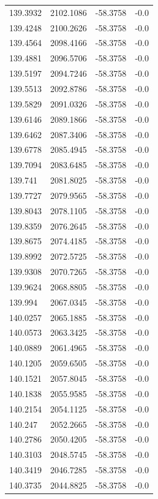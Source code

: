 \begin{table}[H]
\begin{tabular}{llll}
139.3932 & 2102.1086 & -58.3758 & -0.0 \\
139.4248 & 2100.2626 & -58.3758 & -0.0 \\
139.4564 & 2098.4166 & -58.3758 & -0.0 \\
139.4881 & 2096.5706 & -58.3758 & -0.0 \\
139.5197 & 2094.7246 & -58.3758 & -0.0 \\
139.5513 & 2092.8786 & -58.3758 & -0.0 \\
139.5829 & 2091.0326 & -58.3758 & -0.0 \\
139.6146 & 2089.1866 & -58.3758 & -0.0 \\
139.6462 & 2087.3406 & -58.3758 & -0.0 \\
139.6778 & 2085.4945 & -58.3758 & -0.0 \\
139.7094 & 2083.6485 & -58.3758 & -0.0 \\
139.741 & 2081.8025 & -58.3758 & -0.0 \\
139.7727 & 2079.9565 & -58.3758 & -0.0 \\
139.8043 & 2078.1105 & -58.3758 & -0.0 \\
139.8359 & 2076.2645 & -58.3758 & -0.0 \\
139.8675 & 2074.4185 & -58.3758 & -0.0 \\
139.8992 & 2072.5725 & -58.3758 & -0.0 \\
139.9308 & 2070.7265 & -58.3758 & -0.0 \\
139.9624 & 2068.8805 & -58.3758 & -0.0 \\
139.994 & 2067.0345 & -58.3758 & -0.0 \\
140.0257 & 2065.1885 & -58.3758 & -0.0 \\
140.0573 & 2063.3425 & -58.3758 & -0.0 \\
140.0889 & 2061.4965 & -58.3758 & -0.0 \\
140.1205 & 2059.6505 & -58.3758 & -0.0 \\
140.1521 & 2057.8045 & -58.3758 & -0.0 \\
140.1838 & 2055.9585 & -58.3758 & -0.0 \\
140.2154 & 2054.1125 & -58.3758 & -0.0 \\
140.247 & 2052.2665 & -58.3758 & -0.0 \\
140.2786 & 2050.4205 & -58.3758 & -0.0 \\
140.3103 & 2048.5745 & -58.3758 & -0.0 \\
140.3419 & 2046.7285 & -58.3758 & -0.0 \\
140.3735 & 2044.8825 & -58.3758 & -0.0 \\

\end{tabular}
\end{table}
